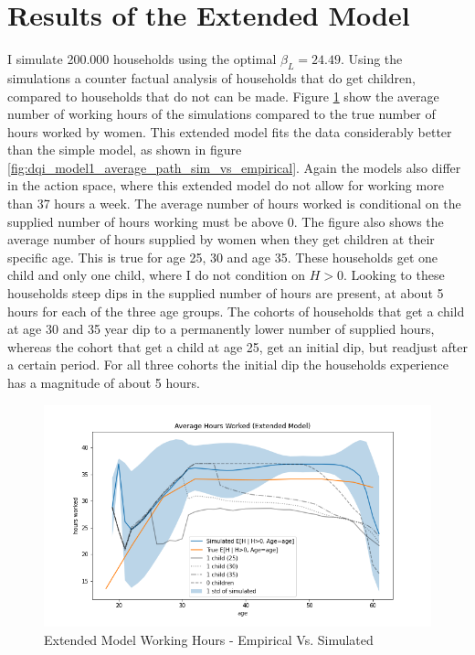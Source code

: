 \section{Results of the Extended Model}

I simulate 200.000 households using the optimal $\beta_L = 24.49$. Using the simulations a counter factual analysis of households that do get children, compared to households that do not can be made. Figure \ref{fig:ext_model_working_hours} show the average number of working hours of the simulations compared to the true number of hours worked by women. This extended model fits the data considerably better than the simple model, as shown in figure \ref{fig:dqi_model1_average_path_sim_vs_empirical}. Again the models also differ in the action space, where this extended model do not allow for working more than 37 hours a week. The average number of hours worked is conditional on the supplied number of hours working must be above 0. The figure also shows the average number of hours supplied by women when they get children at their specific age. This is true for age 25, 30 and age 35. These households get one child and only one child, where I do not condition on $H>0$. Looking to these households steep dips in the supplied number of hours are present, at about 5 hours for each of the three age groups. The cohorts of households that get a child at age 30 and 35 year dip to a permanently lower number of supplied hours, whereas the cohort that get a child at age 25, get an initial dip, but readjust after a certain period. For all three cohorts the initial dip the households experience has a magnitude of about 5 hours.

\begin{figure}
    \centering
    \includegraphics[scale=0.4]{figures/extended_model_average_hours.png}
    \caption{Extended Model Working Hours - Empirical Vs. Simulated}
    \label{fig:ext_model_working_hours}
\end{figure}

